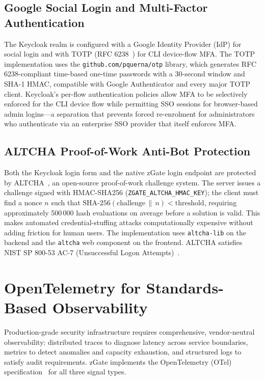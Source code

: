 \subsection{Google Social Login and Multi-Factor Authentication}

The Keycloak realm is configured with a Google Identity Provider (IdP) for social login and with TOTP (RFC 6238~\cite{rfc-6238}) for CLI device-flow MFA. The TOTP implementation uses the \texttt{github.com/pquerna/otp} library, which generates RFC 6238-compliant time-based one-time passwords with a 30-second window and SHA-1 HMAC, compatible with Google Authenticator and every major TOTP client. Keycloak's per-flow authentication policies allow MFA to be selectively enforced for the CLI device flow while permitting SSO sessions for browser-based admin logins---a separation that prevents forced re-enrolment for administrators who authenticate via an enterprise SSO provider that itself enforces MFA.

\subsection{ALTCHA Proof-of-Work Anti-Bot Protection}

Both the Keycloak login form and the native zGate login endpoint are protected by ALTCHA~\cite{altcha-spec}, an open-source proof-of-work challenge system. The server issues a challenge signed with HMAC-SHA256 (\texttt{ZGATE\_ALTCHA\_HMAC\_KEY}); the client must find a nonce $n$ such that $\text{SHA-256}(\text{challenge} \,\|\, n) < \text{threshold}$, requiring approximately 500\,000 hash evaluations on average before a solution is valid. This makes automated credential-stuffing attacks computationally expensive without adding friction for human users. The implementation uses \texttt{altcha-lib} on the backend and the \texttt{altcha} web component on the frontend. ALTCHA satisfies NIST SP 800-53 AC-7 (Unsuccessful Logon Attempts)~\cite{nist-controls}.

\section{OpenTelemetry for Standards-Based Observability}
\label{sec:otel}

Production-grade security infrastructure requires comprehensive, vendor-neutral observability: distributed traces to diagnose latency across service boundaries, metrics to detect anomalies and capacity exhaustion, and structured logs to satisfy audit requirements. zGate implements the OpenTelemetry (OTel) specification~\cite{otel-spec} for all three signal types.

